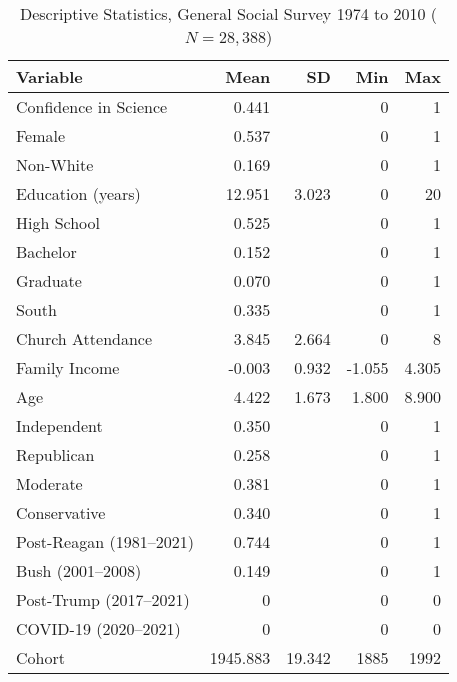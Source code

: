 \begin{table}[ht]
\centering
\caption{Descriptive Statistics, General Social Survey 1974 to 2010 ($N=28,388$)} 
\begin{tabularx}{\textwidth}{Xrrrr}
  \toprule
Variable & Mean & SD & Min & Max \\ 
  \midrule
Confidence in Science & 0.441 &  & 0 & 1 \\ 
  Female & 0.537 &  & 0 & 1 \\ 
  Non-White & 0.169 &  & 0 & 1 \\ 
  Education (years) & 12.951 & 3.023 & 0 & 20 \\ 
  High School & 0.525 &  & 0 & 1 \\ 
  Bachelor & 0.152 &  & 0 & 1 \\ 
  Graduate & 0.070 &  & 0 & 1 \\ 
  South & 0.335 &  & 0 & 1 \\ 
  Church Attendance & 3.845 & 2.664 & 0 & 8 \\ 
  Family Income & -0.003 & 0.932 & -1.055 & 4.305 \\ 
  Age & 4.422 & 1.673 & 1.800 & 8.900 \\ 
  Independent & 0.350 &  & 0 & 1 \\ 
  Republican & 0.258 &  & 0 & 1 \\ 
  Moderate & 0.381 &  & 0 & 1 \\ 
  Conservative & 0.340 &  & 0 & 1 \\ 
  Post-Reagan (1981--2021) & 0.744 &  & 0 & 1 \\ 
  Bush (2001--2008) & 0.149 &  & 0 & 1 \\ 
  Post-Trump (2017--2021) & 0 &  & 0 & 0 \\ 
  COVID-19 (2020--2021) & 0 &  & 0 & 0 \\ 
  Cohort & 1945.883 & 19.342 & 1885 & 1992 \\ 
   \bottomrule
\end{tabularx}
\end{table}
